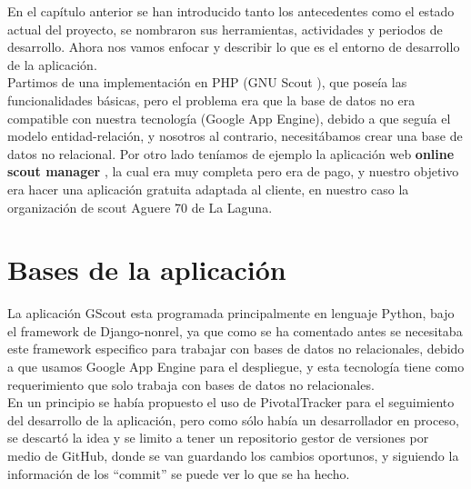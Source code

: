 

En el capítulo anterior se han introducido tanto los antecedentes como el estado actual del proyecto, 
se nombraron sus herramientas, actividades y periodos de desarrollo. Ahora nos vamos enfocar y describir lo que es el
entorno de desarrollo de la aplicación.\\

Partimos de una implementación en PHP (GNU Scout \cite{URL:GNUscout}), que poseía las funcionalidades básicas, pero el problema era que la base de datos
no era compatible con nuestra tecnología (Google App Engine), debido a que seguía el modelo entidad-relación, y nosotros al contrario, necesitábamos
crear una base de datos no relacional. Por otro lado teníamos de ejemplo la aplicación web \textbf{online scout manager} \cite{URL:OnlineScoutManager}, la cual era muy completa
pero era de pago, y nuestro objetivo era hacer una aplicación gratuita adaptada al cliente, en nuestro caso la organización de scout Aguere 70 de La Laguna.



\section{Bases de la aplicación}
\label{2:sec1}

La aplicación GScout esta programada principalmente en lenguaje Python, bajo el framework de Django-nonrel,  
ya que como se ha comentado antes se necesitaba este framework especifico para trabajar con bases de datos no relacionales,
debido a que usamos Google App Engine para el despliegue, y esta tecnología tiene como requerimiento que solo trabaja con
bases de datos no relacionales. \\

En un principio se había propuesto el uso de PivotalTracker para el seguimiento del desarrollo de la aplicación, 
pero como sólo había un desarrollador en proceso, se descartó la idea y se limito a tener un repositorio gestor de versiones por medio de
GitHub, donde se van guardando los cambios oportunos, y siguiendo la información de los ``commit'' se puede ver lo que se ha hecho.\\

